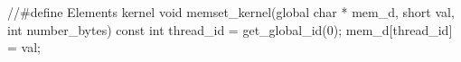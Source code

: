 //#define Elements
kernel void memset_kernel(global char * mem_d, short val, int number_bytes){
    const int thread_id = get_global_id(0);
    mem_d[thread_id] = val;
}
